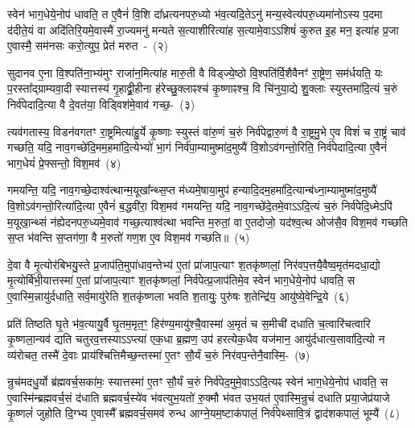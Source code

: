 स्वेन॑ भाग॒धेये॒नोप॑ धावति॒ त ए॒वैनं॑ वि॒शि दा᳚ध्रत्यनपरु॒ध्यो भ॑व॒त्यदि॒ते\-ऽनु॑ मन्य॒स्वेत्य॑परु॒ध्यमा॑नो\-ऽस्य प॒दमा द॑दीते॒यं वा अदि॑तिरि॒यमे॒वास्मै॑ रा॒ज्यमनु॑ मन्यते स॒त्याशीरित्या॑ह स॒त्यामे॒वा\-ऽऽ\-शिषं॑ कुरुत इ॒ह मन॒ इत्या॑ह प्र॒जा ए॒वास्मै॒ सम॑नसः करो॒त्युप॒ प्रेत॑ मरुत~-~(२)

सुदानव ए॒ना वि॒श्पति॑ना॒भ्य॑मुꣳ राजा॑न॒मित्या॑ह मारु॒ती वै विड्ज्ये॒ष्ठो वि॒श्पति॑र्वि॒शैवैनꣳ॑ रा॒ष्ट्रेण॒ सम॑र्धयति॒ यः प॒रस्ता᳚द्ग्राम्यवा॒दी स्यात्तस्य॑ गृ॒हाद्व्री॒हीना ह॑रेच्छु॒क्लाꣴश्च॑ कृ॒ष्णाꣴश्च॒ वि चि॑नुया॒द्ये शु॒क्लाः स्युस्तमा॑दि॒त्यं च॒रुं निर्व॑पेदादि॒त्या वै दे॒वत॑या॒ विड्विश॑मे॒वाव॑ \mbox{गच्छ॒-~(३)}

त्यव॑गतास्य॒ विडन॑वगतꣳ रा॒ष्ट्रमित्या॑हु॒र्ये कृ॒ष्णाः स्युस्तं वा॑रु॒णं च॒रुं निर्व॑पेद्वारु॒णं वै रा॒ष्ट्रमु॒भे ए॒व विशं॑ च रा॒ष्ट्रं चाव॑ गच्छति॒ यदि॒ नाव॒गच्छे॑दि॒मम॒हमा॑दि॒त्येभ्यो॑ भा॒गं निर्व॑पा॒म्यामुष्मा॑द॒मुष्यै॑ वि॒शो\-ऽव॑गन्तो॒रिति॒ निर्व॑पेदादि॒त्या ए॒वैनं॑ भाग॒धेयं॑ प्रे॒फ्सन्तो॒ विश॒मव॑~(४)

गमयन्ति॒ यदि॒ नाव॒गच्छे॒दाश्व॑त्थान्म॒यूखा᳚न्थ्स॒प्त म॑ध्यमे॒षाया॒मुप॑ हन्या\-दि॒द\-म॒हमा॑\-दि॒त्यान्ब॑ध्ना॒म्यामुष्मा॑\-द॒मुष्यै॑ वि॒शो\-ऽव॑गन्तो॒रित्या॑\-दि॒त्या ए॒वैनं॑ ब॒द्धवी॑रा॒ विश॒मव॑ गमयन्ति॒ यदि॒ नाव॒गच्छे॑दे॒तमे॒वा\-ऽऽ\-दि॒त्यं च॒रुं निर्व॑पेदि॒ध्मे\-ऽपि॑ म॒यूखा॒न्थ्सं न॑ह्येदनपरु॒ध्यमे॒वाव॑ गच्छ॒त्याश्व॑त्था भवन्ति म॒रुतां॒ वा ए॒तदोजो॒ यद॑श्व॒त्थ ओज॑सै॒व विश॒मव॑ गच्छति स॒प्त भ॑वन्ति स॒प्तग॑णा॒ वै म॒रुतो॑ गण॒श ए॒व विश॒मव॑ गच्छति॥~(५)

{\anuvakamend[{धा॒रय॑द्वतो मरुतो गच्छति॒ विश॒मवै॒तद॒ष्टाद॑श च}]}%

दे॒वा वै मृ॒त्योर॑बिभयु॒स्ते प्र॒जा\-प॑ति॒मुपा॑धाव॒न्तेभ्य॑ ए॒तां प्रा॑जाप॒त्याꣳ श॒तकृ॑ष्णलां॒ निर॑वप॒त्तयै॒वैष्व॒मृत॑मदधा॒द्यो मृ॒त्योर्बि॑भी॒यात्तस्मा॑ ए॒तां प्रा॑जाप॒त्याꣳ श॒तकृ॑ष्णलां॒ निर्व॑पेत्प्र॒जा\-प॑तिमे॒व स्वेन॑ भाग॒धेये॒नोप॑ धावति॒ स ए॒वास्मि॒न्नायु॑र्दधाति॒ सर्व॒मायु॑रेति श॒तकृ॑ष्णला भवति श॒तायुः॒ पुरु॑षः श॒तेन्द्रि॑य॒ आयु॑ष्ये॒वेन्द्रि॒ये~(६)

प्रति॑ तिष्ठति घृ॒ते भ॑व॒त्यायु॒र्वै घृ॒तम॒मृत॒ꣳ॒ हिर॑ण्य॒मायु॑श्चै॒वा\-स्मा॑ अ॒मृतं॑ च स॒मीची॑ दधाति च॒त्वारि॑चत्वारि कृ॒ष्णला॒न्यव॑ द्यति चतुरव॒त्तस्या\-ऽऽ\-प्त्या॑ एक॒धा ब्र॒ह्मण॒ उप॑ हरत्येक॒धैव यज॑मान॒ आयु॑र्दधात्य॒सावा॑दि॒त्यो न व्य॑रोचत॒ तस्मै॑ दे॒वाः प्राय॑श्चित्ति\-मैच्छ॒न्तस्मा॑ ए॒तꣳ सौ॒र्यं च॒रुं निर॑वप॒न्तेनै॒वास्मि॒-~(७)

न्रुच॑मदधु॒र्यो ब्र॑ह्मवर्च॒सका॑मः॒ स्यात्तस्मा॑ ए॒तꣳ सौ॒र्यं च॒रुं निर्व॑पेद॒मुमे॒वा\-ऽऽ\-दि॒त्यꣴ स्वेन॑ भाग॒धेये॒नोप॑ धावति॒ स ए॒वास्मि॑न्ब्रह्मवर्च॒सं द॑धाति ब्रह्मवर्च॒स्ये॑व भ॑वत्युभ॒यतो॑ रु॒क्मौ भ॑वत उभ॒यत॑ ए॒वास्मि॒न्रुचं॑ दधाति प्रया॒जेप्र॑याजे कृ॒ष्णलं॑ जुहोति दि॒ग्भ्य ए॒वास्मै᳚ ब्रह्मवर्च॒समव॑ रुन्ध आग्ने॒यम॒ष्टा\-क॑पालं॒ निर्व॑पेथ्सावि॒त्रं द्वाद॑श\-कपालं॒ भूम्यै॑~(८)

